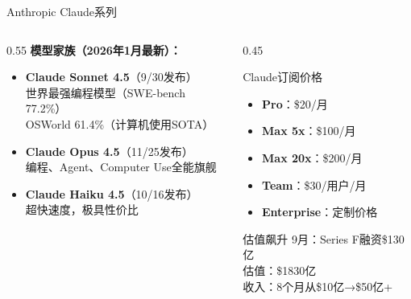 \documentclass[aspectratio=169,11pt]{beamer}
\begin{document}
\begin{frame}{Anthropic Claude系列}
    \begin{columns}
        \begin{column}{0.55\textwidth}
            \textbf{模型家族（2026年1月最新）：}
            \begin{itemize}
                \item \textbf{Claude Sonnet 4.5}（9/30发布）\\
                    {\small 世界最强编程模型（SWE-bench 77.2\%）\\
                    OSWorld 61.4\%（计算机使用SOTA）}
                \item \textbf{Claude Opus 4.5}（11/25发布）\\
                    {\small 编程、Agent、Computer Use全能旗舰}
                \item \textbf{Claude Haiku 4.5}（10/16发布）\\
                    {\small 超快速度，极具性价比}
            \end{itemize}
        \end{column}
        \begin{column}{0.45\textwidth}
            \begin{block}{Claude订阅价格}
                \begin{itemize}
                    \item \textbf{Pro}：\$20/月
                    \item \textbf{Max 5x}：\$100/月
                    \item \textbf{Max 20x}：\$200/月
                    \item \textbf{Team}：\$30/用户/月
                    \item \textbf{Enterprise}：定制价格
                \end{itemize}
            \end{block}
            \vspace{0.2cm}
            \begin{alertblock}{估值飙升}
                \small
                9月：Series F融资\$130亿\\
                估值：\$1830亿\\
                收入：8个月从\$10亿→\$50亿+
            \end{alertblock}
        \end{column}
    \end{columns}
\end{frame}
\end{document}
